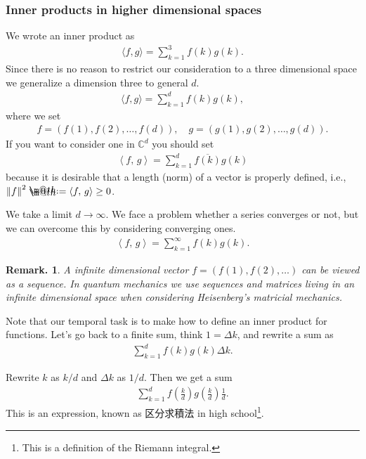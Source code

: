 \documentclass[openany, a4paper, oneside]{jsbook}
\makeatletter
\newcommand*{\defeq}{\mathrel{\rlap{%
\raisebox{0.3ex}{$\m@th\cdot$}}%
\raisebox{-0.3ex}{$\m@th\cdot$}}%
=}
\theoremstyle{break}
\theoremstyle{breakdefn}
\newtheorem{rem}[thm]{Remark.}
\newcommand{\norm}[1]{\left\Vert#1\right\Vert}
\newcommand{\rbk}[1]{\left (#1\right)}
\newcommand{\bkt}[2]{\left\langle#1,\,#2\right\rangle}
\newcommand{\bbC}{\mathbb{C}}
\makeatother
\begin{document}
\subsubsection{Inner products in higher dimensional spaces}


We wrote an inner product as
\begin{align}
 \langle f , g \rangle
 =
 \sum_{k=1}^3 f(k)g(k).
\end{align}
Since there is no reason to restrict our consideration to a three dimensional space
we generalize a dimension three to general $d$.
\begin{align}
 \langle f , g \rangle
 =
 \sum_{k=1}^d f(k)g(k),
\end{align}
where we set
\begin{align}
 f = \rbk{f(1), f(2), \dots, f(d)}, \quad
 g = \rbk{g(1), g(2), \dots, g(d)}.
\end{align}
If you want to consider one in $\bbC^d$ you should set
\begin{align}
 \bkt{f}{g}
 =
 \sum_{k=1}^d \overline{f(k)} g(k)
\end{align}
because it is desirable that a length (norm) of a vector is
properly defined, i.e., $\norm{f}^2 \defeq \bkt{f}{g} \geq 0$.

We take a limit $d \to \infty$.
We face a problem whether a series converges or not,
but we can overcome this by considering converging ones.
\begin{align}
 \bkt{f}{g}
 =
 \sum_{k=1}^{\infty} f(k)g(k).
\end{align}

\begin{rem}
 A infinite dimensional vector $f = (f(1), f(2), \dots)$
 can be viewed as a sequence.
 In quantum mechanics we use sequences and matrices living in an infinite dimensional space
 when considering Heisenberg's matricial mechanics.
\end{rem}

Note that our temporal task is to make how to define an inner product for functions.
Let's go back to a finite sum, think $1 = \Delta k$, and rewrite a sum as
\begin{align}
 \sum_{k=1}^{d} f(k)g(k) \Delta k.
\end{align}

Rewrite $k$ as $k/d$ and $\Delta k$ as $1/d$.
Then we get a sum
\begin{align}
 \sum_{k=1}^{d} f \left( \frac{k}{d} \right) g \left( \frac{k}{d} \right) \frac{1}{d}.
\end{align}
This is an expression, known as 区分求積法 in high school\footnote{This is a definition of the Riemann integral.
 }.
\end{document}
